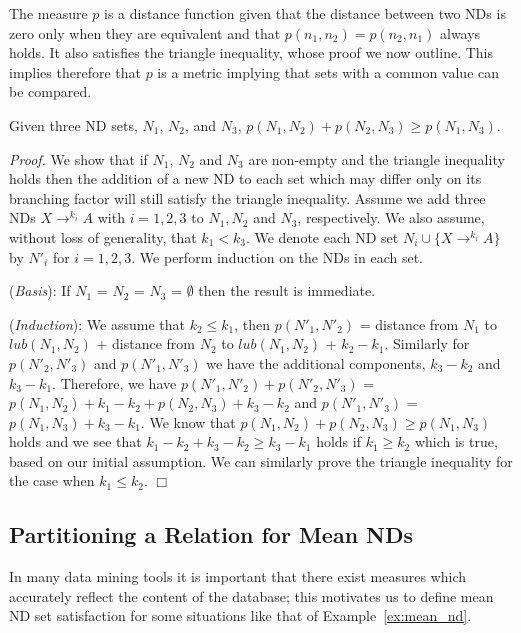 \smallskip

The measure $p$ is a distance function given that the distance
between two NDs is zero only when they are equivalent and that 
$p(n_1,n_2) = p(n_2,n_1)$ always holds. It also satisfies the 
triangle inequality, whose proof we now outline. This implies
therefore that $p$ is a metric implying that sets with a common value
can be compared.

\begin{theorem}
\begin{rm}
Given three ND sets, $N_1$, $N_2$, and $N_3$, $p(N_1,N_2) + p(N_2,N_3)
\ge p(N_1,N_3)$.
\end{rm}
\end{theorem}
\smallskip

{\em Proof.} We show that if $N_1$, $N_2$ and $N_3$ are non-empty and the 
triangle
inequality holds then the addition of a new ND to each set which may
differ only on its branching factor will still satisfy the triangle inequality.
Assume we add three NDs $X \to^{k_i} A$ with $i = 1,2,3$ to $N_1,N_2$ and
$N_3$, respectively. We also assume, without loss of generality, that 
$k_1 < k_3$. We denote each ND set $N_i \cup \{ X \to^{k_i} A \}$ by $N'_i$
for $i = 1,2,3$. We perform induction on the NDs in each set.

\smallskip
({\em Basis}): If $N_1$ = $N_2$ = $N_3$ = $\emptyset$ then the 
result is immediate.

\smallskip
({\em Induction}):
 We assume that $k_2 \le k_1$, then $p(N'_1,N'_2)$ =
distance from $N_1$ to $lub(N_1,N_2)$ + distance from $N_2$ to $lub(N_1,N_2)$ +
$k_2 - k_1$. Similarly for $p(N'_2,N'_3)$ and $p(N'_1,N'_3)$ we have the
additional components, $k_3 - k_2$ and $k_3 - k_1$. Therefore, we have
$p(N'_1,N'_2) + p(N'_2,N'_3)$ = $p(N_1,N_2) + k_1 - k_2 + p(N_2,N_3) +
k_3 - k_2$ and $p(N'_1,N'_3)$ = $p(N_1,N_3) + k_3 - k_1$. We know that  
$p(N_1,N_2) + p(N_2,N_3) \ge p(N_1,N_3)$ holds and we see
 that  $k_1 - k_2 + k_3 - k_2 \ge k_3 - k_1$ holds if $k_1 \ge k_2$ which
is true, based on our initial assumption. We can similarly prove the 
triangle inequality for the case when $k_1 \le k_2$. $\Box$


\subsection{Partitioning a Relation for Mean NDs}\label{nd:subsec:mean}
In many data mining tools it is important that there exist measures
which accurately reflect the content of the database; this motivates
us to define mean ND set satisfaction for some situations like that of
Example~\ref{ex:mean_nd}.

